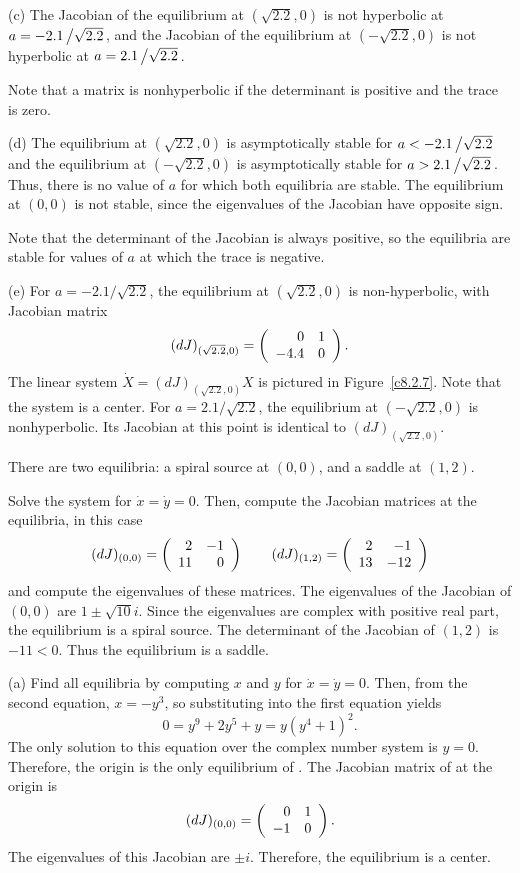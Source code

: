 (c) \ans The Jacobian of the equilibrium at $(\sqrt{2.2},0)$ is not
hyperbolic at $a = -2.1\left/\sqrt{2.2}\right.$, and the Jacobian of the
equilibrium at $(-\sqrt{2.2},0)$ is not hyperbolic at
$a = 2.1\left/\sqrt{2.2}\right.$.

\soln Note that a matrix is nonhyperbolic if the determinant is positive
and the trace is zero.

(d) \ans The equilibrium at $(\sqrt{2.2},0)$ is asymptotically stable for
$a < -2.1\left/\sqrt{2.2}\right.$ and the equilibrium at
$(-\sqrt{2.2},0)$ is asymptotically stable for
$a > 2.1\left/\sqrt{2.2}\right.$.  Thus, there is no value of $a$ for which
both equilibria are stable.  The equilibrium at $(0,0)$ is not stable,
since the eigenvalues of the Jacobian have opposite sign.

\soln Note that the determinant of the Jacobian is always positive, so
the equilibria are stable for values of $a$ at which the trace is negative.

(e) For $a = -2.1/\sqrt{2.2}$, the equilibrium at $(\sqrt{2.2},0)$
is non-hyperbolic, with Jacobian matrix
\[
(dJ)_{(\sqrt{2.2},0)} = \left(\begin{array}{rr} 0 & 1\\ -4.4 &0\end{array}\right).
\]
The linear system $\dot{X} = (dJ)_{(\sqrt{2.2},0)}X$ is pictured in
Figure~\ref{c8.2.7}.  Note that the system is a center.  For
$a = 2.1/\sqrt{2.2}$, the equilibrium at $(-\sqrt{2.2},0)$ is
nonhyperbolic.  Its Jacobian at this point is identical to
$(dJ)_{(\sqrt{2.2},0)}$.

\begin{figure}[htb]
                       \centerline{%
                       }
\end{figure}

\ans There are two equilibria: a spiral source at $(0,0)$, and a saddle
at $(1,2)$.

\soln Solve the system for $\dot{x} = \dot{y} = 0$.  Then, compute the
Jacobian matrices at the equilibria, in this case
\[
(dJ)_{(0,0)} = \left(\begin{array}{rr} 2 & -1\\ 11 &0\end{array}\right) \qquad
(dJ)_{(1,2)} = \left(\begin{array}{rr} 2 & -1\\ 13 &-12\end{array}\right)
\]
and compute the eigenvalues of these matrices.  The eigenvalues of the
Jacobian of $(0,0)$ are $1 \pm \sqrt{10}i$.  Since the eigenvalues
are complex with positive real part, the equilibrium is
a spiral source.  The determinant of the Jacobian of $(1,2)$ is
$-11 < 0$.  Thus the equilibrium is a saddle.

(a) Find all equilibria by computing $x$ and $y$ for $\dot{x} =
\dot{y} = 0$.  Then, from the second equation, $x = -y^3$, so
substituting into the first equation yields
\[
0 = y^9 + 2y^5 + y = y(y^4 + 1)^2.
\]
The only solution to this equation over the complex number system is
$y = 0$.  Therefore, the origin is the only equilibrium of
.  The Jacobian matrix of  at
the origin is 
\[
(dJ)_{(0,0)} = \left(\begin{array}{rr} 0 & 1\\ -1 &0\end{array}\right).
\]
The eigenvalues of this Jacobian are $\pm i$.  Therefore, the equilibrium
is a center.

